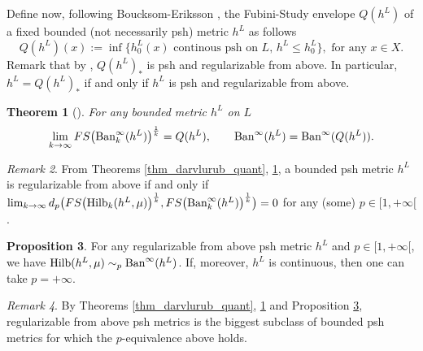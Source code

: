 \documentclass[12pt]{article}
\numberwithin{equation}{section}
\theoremstyle{theorem}
\newtheorem{thm}{Theorem}[section]
\theoremstyle{definition}
\newtheorem{prop}[thm]{Proposition}
\theoremstyle{remark}
\newtheorem{rem}[thm]{Remark}
\begin{document}
	Define now, following Boucksom-Eriksson \cite[\S 7.5]{BouckErik21}, the Fubini-Study envelope $Q(h^L)$ of a fixed bounded (not necessarily psh) metric $h^L$ as follows
	\begin{equation}\label{eq_defn_fs_env}
		Q(h^L)(x) := \inf \Big\{ h^L_0(x) \text{ continous psh on $L$, $h^L \leq h^L_0$} \Big\}, \text{ for any } x \in X.
	\end{equation}
	Remark that by \cite[Proposition I.4.24]{DemCompl}, $Q(h^L)_*$ is psh and regularizable from above.
	In particular, $h^L = Q(h^L)_*$ if and only if $h^L$ is psh and regularizable from above.
	\begin{thm}[{\cite[Theorem 7.26 and Corollary 7.27]{BouckErik21}}]\label{thm_bouck_erikss}
		For any bounded metric $h^L$ on $L$
		\begin{equation}
			\lim_{k \to \infty} FS \big({\rm{Ban}}^{\infty}_k(h^L) \big)^{\frac{1}{k}} = Q(h^L), \qquad {\rm{Ban}}^{\infty}(h^L) = {\rm{Ban}}^{\infty}(Q(h^L)).
		\end{equation}
	\end{thm}
	\begin{rem}\label{rem_bouck_erikss}
		From Theorems \ref{thm_darvlurub_quant}, \ref{thm_bouck_erikss}, a bounded psh metric $h^L$ is regularizable from above if and only if $\lim_{k \to \infty} d_p \big( FS \big( {\rm{Hilb}}_k(h^L, \mu) \big)^{\frac{1}{k}}, FS \big({\rm{Ban}}^{\infty}_k(h^L) \big)^{\frac{1}{k}} \big) = 0$ for any (some) $p \in [1, +\infty[$.
	\end{rem}
	\begin{prop}\label{prop_ban_hilb_eq}
		For any regularizable from above psh metric $h^L$ and $p \in [1, + \infty[$, we have 
		$
			{\rm{Hilb}}(h^L, \mu) \sim_p {\rm{Ban}}^{\infty}(h^L)
		$.
		If, moreover, $h^L$ is continuous, then one can take $p = + \infty$.
	\end{prop}	
	\begin{rem}
		By Theorems \ref{thm_darvlurub_quant}, \ref{thm_bouck_erikss} and Proposition \ref{prop_ban_hilb_eq}, regularizable from above psh metrics is the biggest subclass of bounded psh metrics for which the $p$-equivalence above holds.
	\end{rem}
\end{document}
